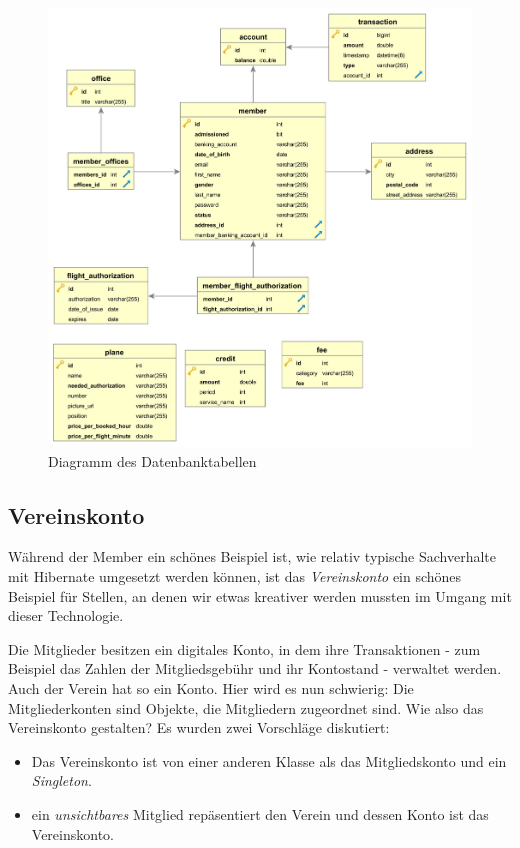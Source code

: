 \documentclass[a4paper, 11pt]{article}
\begin{document}
\begin{figure}[htpb]
    \centering
    \includegraphics[width=\textwidth]{images/erm/all_orthogonal.png}
    \caption{Diagramm des Datenbanktabellen}
    \label{fig:erm_all}
\end{figure}

\subsection{Vereinskonto}

Während der Member ein schönes Beispiel ist, wie relativ typische Sachverhalte
mit Hibernate umgesetzt werden können, ist das \emph{Vereinskonto} ein schönes
Beispiel für Stellen, an denen wir etwas kreativer werden mussten im Umgang mit
dieser Technologie.

Die Mitglieder besitzen ein digitales Konto, in dem ihre Transaktionen - zum
Beispiel das Zahlen der Mitgliedsgebühr und ihr Kontostand - verwaltet werden.
Auch der Verein hat so ein Konto. Hier wird es nun schwierig: Die
Mitgliederkonten sind Objekte, die Mitgliedern zugeordnet sind. Wie also das
Vereinskonto gestalten? Es wurden zwei Vorschläge diskutiert:

\begin{itemize}
    \item Das Vereinskonto ist von einer anderen Klasse als das Mitgliedskonto
        und ein \emph{Singleton}.
    \item ein \emph{unsichtbares} Mitglied repäsentiert den Verein und dessen
        Konto ist das Vereinskonto.
\end{itemize}
\end{document}
